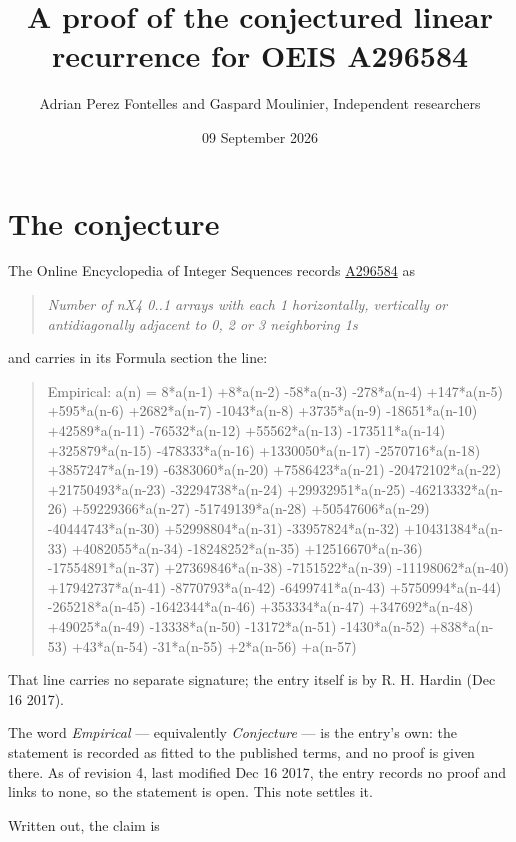 \documentclass[11pt]{article}
\title{A proof of the conjectured linear recurrence for OEIS A296584}
\author{Adrian Perez Fontelles and Gaspard Moulinier, Independent researchers}
\date{09 September 2026}
\theoremstyle{definition}
\begin{document}
\maketitle
\section{The conjecture}

The Online Encyclopedia of Integer Sequences records \href{https://oeis.org/A296584}{A296584} as

\begin{quote}\itshape Number of nX4 0..1 arrays with each 1 horizontally, vertically or antidiagonally adjacent to 0, 2 or 3 neighboring 1s\end{quote}

and carries in its Formula section the line:

\begin{quote}\ttfamily Empirical: a(n) = 8*a(n-1) +8*a(n-2) -58*a(n-3) -278*a(n-4) +147*a(n-5) +595*a(n-6) +2682*a(n-7) -1043*a(n-8) +3735*a(n-9) -18651*a(n-10) +42589*a(n-11) -76532*a(n-12) +55562*a(n-13) -173511*a(n-14) +325879*a(n-15) -478333*a(n-16) +1330050*a(n-17) -2570716*a(n-18) +3857247*a(n-19) -6383060*a(n-20) +7586423*a(n-21) -20472102*a(n-22) +21750493*a(n-23) -32294738*a(n-24) +29932951*a(n-25) -46213332*a(n-26) +59229366*a(n-27) -51749139*a(n-28) +50547606*a(n-29) -40444743*a(n-30) +52998804*a(n-31) -33957824*a(n-32) +10431384*a(n-33) +4082055*a(n-34) -18248252*a(n-35) +12516670*a(n-36) -17554891*a(n-37) +27369846*a(n-38) -7151522*a(n-39) -11198062*a(n-40) +17942737*a(n-41) -8770793*a(n-42) -6499741*a(n-43) +5750994*a(n-44) -265218*a(n-45) -1642344*a(n-46) +353334*a(n-47) +347692*a(n-48) +49025*a(n-49) -13338*a(n-50) -13172*a(n-51) -1430*a(n-52) +838*a(n-53) +43*a(n-54) -31*a(n-55) +2*a(n-56) +a(n-57)\end{quote}

That line carries no separate signature; the entry itself is by R. H. Hardin (Dec 16 2017).

The word {\itshape Empirical} --- equivalently {\itshape Conjecture} --- is the entry's own: the statement is recorded as fitted to the published terms, and no proof is given there. As of revision 4, last modified Dec 16 2017, the entry records no proof and links to none, so the statement is open. This note settles it.

Written out, the claim is
\end{document}

